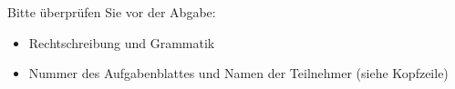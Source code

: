 \documentclass[ngerman]{fbi-aufgabenblatt}
\begin{document}

Bitte überprüfen Sie vor der Abgabe:

\begin{itemize}
	\item Rechtschreibung und Grammatik
	\item Nummer des Aufgabenblattes und  Namen der Teilnehmer (siehe Kopfzeile)
\end{itemize}
\end{document}
